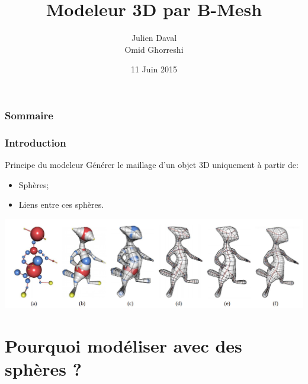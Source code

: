 \documentclass[10pt]{beamer}
\title{Modeleur 3D par B-Mesh}
\author{Julien Daval \\ Omid Ghorreshi}
\institute[Ensimag 2A]{2ème année Ensimag}
\date{11 Juin 2015}
\begin{document}
\begin{frame}
	\titlepage
\end{frame}


\begin{frame}
	\frametitle{Sommaire}
	\tableofcontents
\end{frame}


\begin{frame}
	\frametitle{Introduction}
	\begin{block}{Principe du modeleur}
		Générer le maillage d'un objet 3D uniquement à partir de:
		\begin{itemize}
			\item Sphères;
			\item Liens entre ces sphères.
		\end{itemize}
	\end{block}
	
	\begin{center}
		\includegraphics[scale=0.2]{images/bmesh.jpg}
	\end{center}
\end{frame}


\section{Pourquoi modéliser avec des sphères ?}
\end{document}
